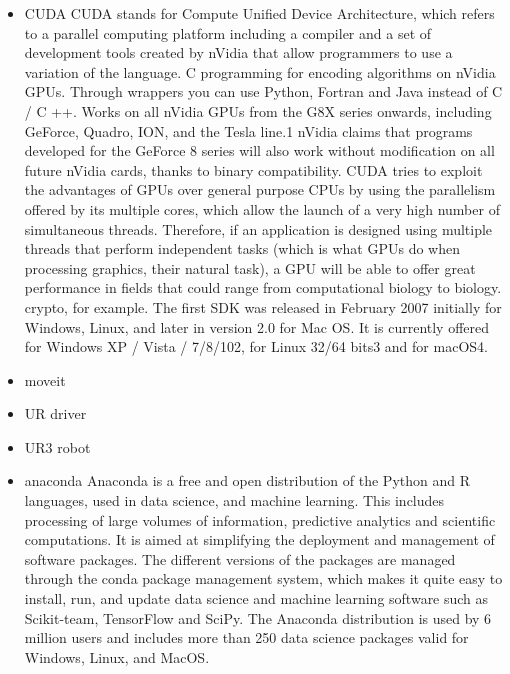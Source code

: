 \begin{itemize}
	\item[\textendash]CUDA
			CUDA stands for Compute Unified Device Architecture, which refers to a parallel computing platform including a compiler and a set of development tools created by nVidia that allow programmers to use a variation of the language. C programming for encoding algorithms on nVidia GPUs.
		Through wrappers you can use Python, Fortran and Java instead of C / C ++.
		Works on all nVidia GPUs from the G8X series onwards, including GeForce, Quadro, ION, and the Tesla line.1 nVidia claims that programs developed for the GeForce 8 series will also work without modification on all future nVidia cards, thanks to binary compatibility.
		CUDA tries to exploit the advantages of GPUs over general purpose CPUs by using the parallelism offered by its multiple cores, which allow the launch of a very high number of simultaneous threads. Therefore, if an application is designed using multiple threads that perform independent tasks (which is what GPUs do when processing graphics, their natural task), a GPU will be able to offer great performance in fields that could range from computational biology to biology. crypto, for example.
		The first SDK was released in February 2007 initially for Windows, Linux, and later in version 2.0 for Mac OS. It is currently offered for Windows XP / Vista / 7/8/102, for Linux 32/64 bits3 and for macOS4.

	\item[\textendash]moveit
	\item[\textendash]UR driver	
	\item[\textendash]UR3 robot
	\item[\textendash]anaconda
		Anaconda is a free and open distribution of the Python and R languages, used in data science, and machine learning. This includes processing of large volumes of information, predictive analytics and scientific computations. It is aimed at simplifying the deployment and management of software packages.
		The different versions of the packages are managed through the conda package management system, which makes it quite easy to install, run, and update data science and machine learning software such as Scikit-team, TensorFlow and SciPy.
		The Anaconda distribution is used by 6 million users and includes more than 250 data science packages valid for Windows, Linux, and MacOS.
	\end{itemize}
	
